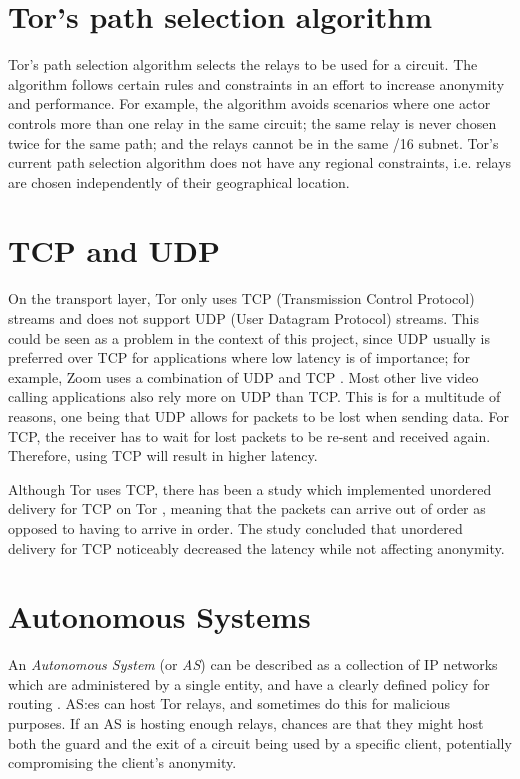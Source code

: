 \documentclass{kththesis}
\begin{document}
\section{Tor's path selection algorithm}
Tor's path selection algorithm \parencite{TorPathSpecification} selects the relays to be used for a circuit. The algorithm follows certain rules and constraints in an effort to increase anonymity and performance. For example, the algorithm avoids scenarios where one actor controls more than one relay in the same circuit; the same relay is never chosen twice for the same path; and the relays cannot be in the same /16 subnet. Tor's current path selection algorithm does not have any regional constraints, i.e. relays are chosen independently of their geographical location.

\section{TCP and UDP}
On the transport layer, Tor only uses TCP (Transmission Control Protocol) streams \parencite{officialTorOverview} and does not support UDP (User Datagram Protocol) streams. This could be seen as a problem in the context of this project, since UDP usually is preferred over TCP for applications where low latency is of importance; for example, Zoom uses a combination of UDP and TCP \parencite{ZoomTCPandUDP}. Most other live video calling applications also rely more on UDP than TCP. This is for a multitude of reasons, one being that UDP allows for packets to be lost when sending data. For TCP, the receiver has to wait for lost packets to be re-sent and received again. Therefore, using TCP will result in higher latency.

Although Tor uses TCP, there has been a study which implemented unordered delivery for TCP on Tor \parencite{unorderedTCPdelivery}, meaning that the packets can arrive out of order as opposed to having to arrive in order. The study concluded that unordered delivery for TCP noticeably decreased the latency while not affecting anonymity.

\section{Autonomous Systems}
An \emph{Autonomous System} (or \emph{AS}) can be described as a collection of IP networks which are administered by a single entity, and have a clearly defined policy for routing \parencite{hawkinson1996guidelines}. AS:es can host Tor relays, and sometimes do this for malicious purposes. If an AS is hosting enough relays, chances are that they might host both the guard and the exit of a circuit being used by a specific client, potentially compromising the client's anonymity.
\end{document}
